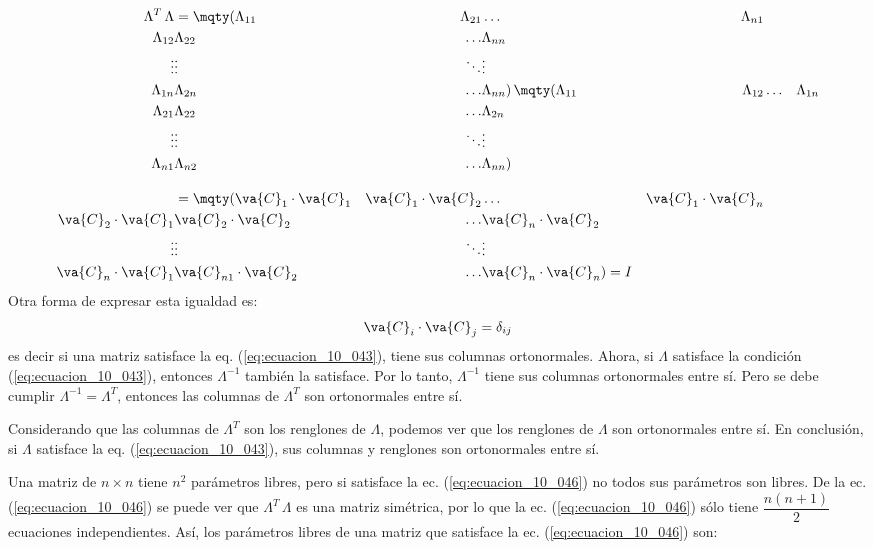 \begin{align}
\Lambda^{T} \, \Lambda &= \mqty(\Lambda_{11} & \Lambda_{21} & \ldots & \Lambda_{n1} \\ \Lambda_{12} & \Lambda_{22} & \ldots & \Lambda_{nn} \\ \vdots & \vdots & \ddots & \vdots \\ \Lambda_{1n} & \Lambda_{2n} & \ldots & \Lambda_{nn}) \, \mqty(\Lambda_{11} & \Lambda_{12} & \ldots & \Lambda_{1n} \\ \Lambda_{21} & \Lambda_{22} & \ldots & \Lambda_{2n} \\ \vdots & \vdots & \ddots & \vdots \\ \Lambda_{n1} & \Lambda_{n2} & \ldots & \Lambda_{nn}) \nonumber \\[1em]
&= \mqty(\va{C}_{1} \cdot \va{C}_{1} & \va{C}_{1} \cdot \va{C}_{2} & \ldots & \va{C}_{1} \cdot \va{C}_{n} \\ \va{C}_{2} \cdot \va{C}_{1} & \va{C}_{2} \cdot \va{C}_{2} & \ldots & \va{C}_{n} \cdot \va{C}_{2} \\ \vdots & \vdots & \ddots & \vdots \\ \va{C}_{n} \cdot \va{C}_{1} & \va{C}_{n1} \cdot \va{C}_{2} & \ldots & \va{C}_{n} \cdot \va{C}_{n}) = I
\label{eq:ecuacion_10_046}
\end{align}
Otra forma de expresar esta igualdad es:
\begin{align}
\va{C}_{i} \cdot \va{C}_{j} = \delta_{ij}
\label{eq:ecuacion_10_047}
\end{align}
es decir si una matriz satisface la eq. (\ref{eq:ecuacion_10_043}), tiene sus columnas ortonormales. Ahora, si $\Lambda$ satisface la condición (\ref{eq:ecuacion_10_043}), entonces $\Lambda^{-1}$ también la satisface. Por lo tanto, $\Lambda^{-1}$ tiene sus columnas ortonormales entre sí. Pero se debe cumplir $\Lambda^{-1} = \Lambda^{T}$, entonces las columnas de $\Lambda^{T}$ son ortonormales entre sí.
\par
Considerando que las columnas de $\Lambda^{T}$ son los renglones de $\Lambda$, podemos ver que los renglones de $\Lambda$ son ortonormales entre sí. En conclusión, si $\Lambda$ satisface la eq. (\ref{eq:ecuacion_10_043}), sus columnas y renglones son ortonormales entre sí.
\par
Una matriz de $n \times n$ tiene $n^{2}$ parámetros libres, pero si satisface la ec. (\ref{eq:ecuacion_10_046}) no todos sus parámetros son libres. De la ec. (\ref{eq:ecuacion_10_046}) se puede ver que $\Lambda^{T} \, \Lambda$ es una matriz simétrica, por lo que la ec. (\ref{eq:ecuacion_10_046}) sólo tiene $\dfrac{n (n+1)}{2}$ ecuaciones independientes. Así, los parámetros libres de una matriz que satisface la ec. (\ref{eq:ecuacion_10_046}) son:
